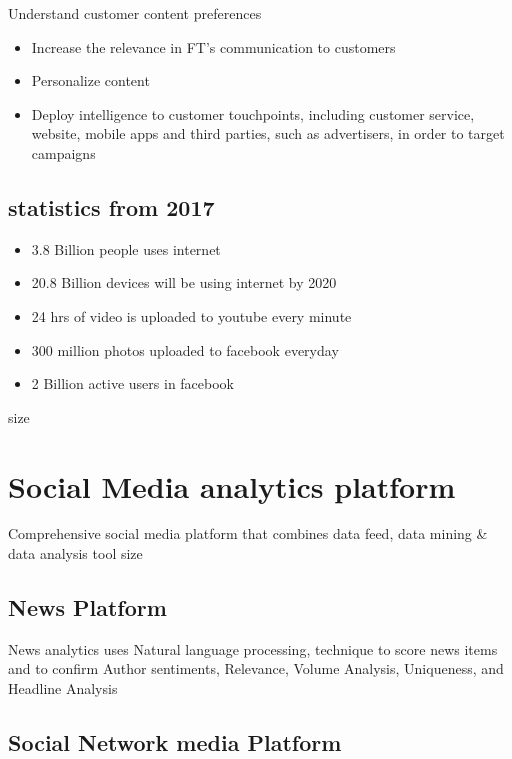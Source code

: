 \documentclass[sigconf]{acmart}
\begin{document}
Understand customer content preferences
\begin{itemize}
\item Increase the relevance in FT’s communication to customers
\item Personalize content
\item Deploy intelligence to customer touchpoints, including customer service, website, mobile apps and third parties, such as advertisers, in order to target campaigns
\end{itemize}

\subsection{statistics from 2017}

\begin{itemize} 
\item  3.8 Billion people uses internet
\item  20.8 Billion devices will be using internet by 2020
\item 24 hrs of video is uploaded to youtube every minute
\item 300 million photos uploaded to facebook everyday
\item 2 Billion active users in facebook
\end{itemize}
size \cite{Stats}

\section{Social Media analytics platform}

Comprehensive social media platform that combines data feed, data mining & data analysis tool
size \cite{SocialMedia}

\subsection{News Platform}

News analytics uses Natural language processing, technique to score news items and to confirm Author sentiments, Relevance, Volume Analysis, Uniqueness, and Headline Analysis

\subsection{Social Network media Platform}
\end{document}
